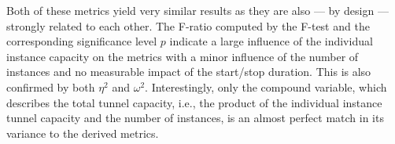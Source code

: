 Both of these metrics yield very similar results as they are also --- by design --- strongly related to each other. The F-ratio computed by the F-test and the corresponding significance level $p$ indicate a large influence of the individual instance capacity on the metrics with a minor influence of the number of instances and no measurable impact of the start/stop duration. This is also confirmed by both $\eta^2$ and $\omega^2$. Interestingly, only the compound variable, which describes the total tunnel capacity, i.e., the product of the individual instance tunnel capacity and the number of instances, is an almost perfect match in its variance to the derived metrics.











